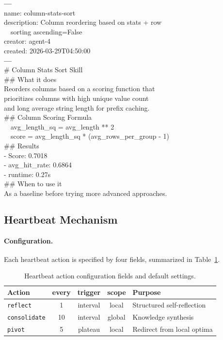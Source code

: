 \begin{promptbox}
\label{box:example_skill}
\ttfamily\scriptsize
\textrm{\textbf{---}}\\
name: column-stats-sort\\
description: Column reordering based on stats + row\\
~~sorting ascending=False\\
creator: agent-4\\
created: 2026-03-29T04:50:00\\
\textrm{\textbf{---}}\\[2pt]
\# Column Stats Sort Skill\\[2pt]
\#\# What it does\\
Reorders columns based on a scoring function that\\
prioritizes columns with high unique value count\\
and long average string length for prefix caching.\\[2pt]
\#\# Column Scoring Formula\\
~~avg\_length\_sq = avg\_length ** 2\\
~~score = avg\_length\_sq * (avg\_rows\_per\_group - 1)\\[2pt]
\#\# Results\\
- Score: 0.7018\\
- avg\_hit\_rate: 0.6864\\
- runtime: 0.27s\\[2pt]
\#\# When to use it\\
As a baseline before trying more advanced approaches.
\end{promptbox}


\subsection{Heartbeat Mechanism}
\label{app:heartbeat}

\paragraph{Configuration.} Each heartbeat action is specified by four fields, summarized in Table~\ref{tab:heartbeat_config}.

\begin{table}[h!]
\caption{Heartbeat action configuration fields and default settings.}
\label{tab:heartbeat_config}
\centering
\setlength{\tabcolsep}{6pt}
\begin{tabular}{l c c c l}
\toprule
\textbf{Action} & \textbf{every} & \textbf{trigger} & \textbf{scope} & \textbf{Purpose} \\
\midrule
\texttt{reflect} & 1 & interval & local & Structured self-reflection \\
\texttt{consolidate} & 10 & interval & global & Knowledge synthesis \\
\texttt{pivot} & 5 & plateau & local & Redirect from local optima \\
\bottomrule
\end{tabular}
\end{table}

